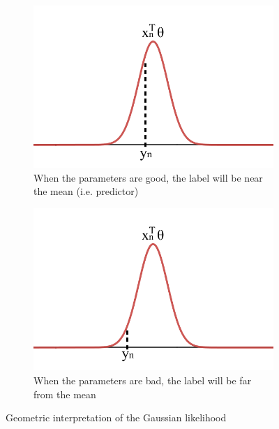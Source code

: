 \begin{description}
        \begin{figure}[ht]
            \begin{subfigure}{.45\textwidth}
                \centering
                \includegraphics[width=.75\linewidth]{img/gaussian_mle_good.png}
                \caption{When the parameters are good, the label will be near the mean (i.e. predictor)}
            \end{subfigure}
            \hspace*{1em}
            \begin{subfigure}{.45\textwidth}
                \centering
                \includegraphics[width=.75\linewidth]{img/gaussian_mle_bad.png}
                \caption{When the parameters are bad, the label will be far from the mean}
            \end{subfigure}

            \caption{Geometric interpretation of the Gaussian likelihood}
        \end{figure}
\end{description}


